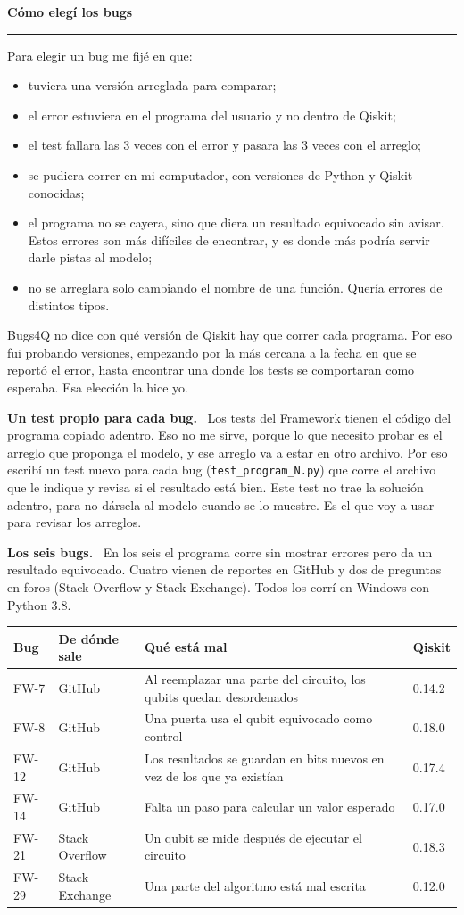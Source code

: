 \documentclass[11pt,a4paper]{article}
\newcommand{\paper}[1]{\vspace{1.2em}\par{\large\textbf{#1}}\par\vspace{0.2em}\hrule\vspace{0.4em}}
\newcommand{\parte}[1]{\par\textbf{#1.}\ }
\begin{document}
\paper{Cómo elegí los bugs}

Para elegir un bug me fijé en que:
\begin{itemize}
  \item tuviera una versión arreglada para comparar;
  \item el error estuviera en el programa del usuario y no dentro de Qiskit;
  \item el test fallara las 3 veces con el error y pasara las 3 veces con el arreglo;
  \item se pudiera correr en mi computador, con versiones de Python y Qiskit conocidas;
  \item el programa no se cayera, sino que diera un resultado equivocado sin avisar. Estos errores son más difíciles de encontrar, y es donde más podría servir darle pistas al modelo;
  \item no se arreglara solo cambiando el nombre de una función. Quería errores de distintos tipos.
\end{itemize}
Bugs4Q no dice con qué versión de Qiskit hay que correr cada programa. Por eso fui probando versiones, empezando por la más cercana a la fecha en que se reportó el error, hasta encontrar una donde los tests se comportaran como esperaba. Esa elección la hice yo.

\parte{Un test propio para cada bug}
Los tests del Framework tienen el código del programa copiado adentro. Eso no me sirve, porque lo que necesito probar es el arreglo que proponga el modelo, y ese arreglo va a estar en otro archivo. Por eso escribí un test nuevo para cada bug (\texttt{test\_program\_N.py}) que corre el archivo que le indique y revisa si el resultado está bien. Este test no trae la solución adentro, para no dársela al modelo cuando se lo muestre. Es el que voy a usar para revisar los arreglos.

\parte{Los seis bugs}
En los seis el programa corre sin mostrar errores pero da un resultado equivocado. Cuatro vienen de reportes en GitHub y dos de preguntas en foros (Stack Overflow y Stack Exchange). Todos los corrí en Windows con Python 3.8.
\begin{center}
\small
\begin{tabular}{llp{6.2cm}l}
\toprule
Bug & De dónde sale & Qué está mal & Qiskit \\
\midrule
FW-7 & GitHub & Al reemplazar una parte del circuito, los qubits quedan desordenados & 0.14.2 \\
FW-8 & GitHub & Una puerta usa el qubit equivocado como control & 0.18.0 \\
FW-12 & GitHub & Los resultados se guardan en bits nuevos en vez de los que ya existían & 0.17.4 \\
FW-14 & GitHub & Falta un paso para calcular un valor esperado & 0.17.0 \\
FW-21 & Stack Overflow & Un qubit se mide después de ejecutar el circuito & 0.18.3 \\
FW-29 & Stack Exchange & Una parte del algoritmo está mal escrita & 0.12.0 \\
\bottomrule
\end{tabular}
\end{center}
\end{document}

